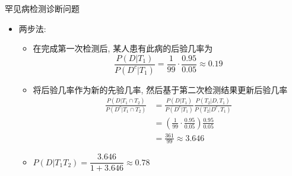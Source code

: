 \documentclass[Prob-All.tex]{subfiles}
\begin{document}
\begin{frame}{罕见病检测诊断问题}
			\begin{itemize}[<+-|alert@+>]
			\item 两步法:
			\begin{itemize}[<+-|alert@+>]
			\item 在完成第一次检测后, 某人患有此病的后验几率为
             $$\frac{P(D|T_1)}{P(D^c|T_1)}=\frac{1}{99}\cdot\frac{0.95}{0.05}\approx 0.19$$
			 \item 将后验几率作为新的先验几率, 然后基于第二次检测结果更新后验几率%
			 \begin{align*}
				\frac{P(D|T_1\cap T_2)}{P(D^c|T_1\cap T_2)}
				&=\frac{P(D|T_1)}{P(D^c|T_1)}\frac{P(T_2|D,T_1)}{P(T_2|D^c,T_1)}\\
				&=(\frac{1}{99}\cdot\frac{0.95}{0.05})\frac{0.95}{0.05}\\
				&=\frac{361}{99}\approx 3.646
			 \end{align*}

			\item $P(D|T_{1}T_{2})=\dfrac{3.646}{1+3.646}\approx 0.78$
			\end{itemize}

		\end{itemize}
\end{frame}
\end{document}
